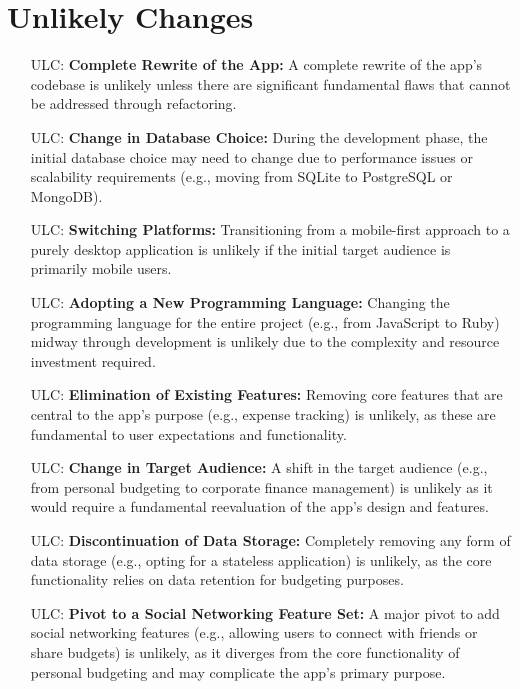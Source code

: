 \documentclass[12pt]{article}
\newcounter{lcnum} %
\newcounter{ulcnum} %
\begin{document}
\newpage

\section{Unlikely Changes}    

\noindent \begin{itemize}
	\item[ULC\refstepcounter{ulcnum}\theulcnum\label{Complete Rewrite of the App}:] \textbf{Complete Rewrite of the App:} A complete rewrite of the app's codebase is unlikely unless there are significant fundamental flaws that cannot be addressed through refactoring.
	\item[ULC\refstepcounter{ulcnum}\theulcnum\label{Change in Database Choice}:] \textbf{Change in Database Choice:} During the development phase, the initial database choice may need to change due to performance issues or scalability requirements (e.g., moving from SQLite to PostgreSQL or MongoDB).
	\item[ULC\refstepcounter{ulcnum}\theulcnum\label{Switching Platforms}:] \textbf{Switching Platforms:} Transitioning from a mobile-first approach to a purely desktop application is unlikely if the initial target audience is primarily mobile users.
	\item[ULC\refstepcounter{ulcnum}\theulcnum\label{Adopting a New Programming Language}:] \textbf{Adopting a New Programming Language:} Changing the programming language for the entire project (e.g., from JavaScript to Ruby) midway through development is unlikely due to the complexity and resource investment required.
	\item[ULC\refstepcounter{ulcnum}\theulcnum\label{Elimination of Existing Features}:] \textbf{Elimination of Existing Features:} Removing core features that are central to the app's purpose (e.g., expense tracking) is unlikely, as these are fundamental to user expectations and functionality.
	\item[ULC\refstepcounter{ulcnum}\theulcnum\label{Change in Target Audience}:] \textbf{Change in Target Audience:} A shift in the target audience (e.g., from personal budgeting to corporate finance management) is unlikely as it would require a fundamental reevaluation of the app's design and features.
	\item[ULC\refstepcounter{ulcnum}\theulcnum\label{Discontinuation of Data Storage}:] \textbf{Discontinuation of Data Storage:} Completely removing any form of data storage (e.g., opting for a stateless application) is unlikely, as the core functionality relies on data retention for budgeting purposes.
	\item[ULC\refstepcounter{ulcnum}\theulcnum\label{Pivot to a Social Networking Feature Set}:] \textbf{Pivot to a Social Networking Feature Set:} A major pivot to add social networking features (e.g., allowing users to connect with friends or share budgets) is unlikely, as it diverges from the core functionality of personal budgeting and may complicate the app's primary purpose.
\end{itemize}
\end{document}
